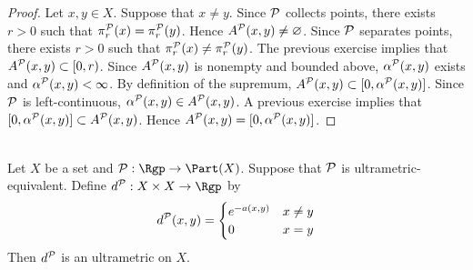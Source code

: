 \documentclass{book}
\begin{document}
\begin{proof}
	Let $x,y \in X$. Suppose that $x \neq y$. Since $\mathcal{P}$ collects points, there exists $r > 0$ such that $\pi^{\mathcal{P}}_r(x) = \pi^{\mathcal{P}}_r(y)$. Hence $A^{\mathcal{P}}(x,y) \neq \varnothing$. Since $\mathcal{P}$ separates points, there exists $r > 0$ such that $\pi^{\mathcal{P}}_r(x) \neq \pi^{\mathcal{P}}_r(y)$. The previous exercise implies that $A^{\mathcal{P}}(x,y) \subset [0, r)$. Since $A^{\mathcal{P}}(x,y)$ is nonempty and bounded above, $\alpha^{\mathcal{P}}(x,y)$ exists and $\alpha^{\mathcal{P}}(x,y) < \infty$. By definition of the supremum, $A^{\mathcal{P}}(x,y) \subset [0, \alpha^{\mathcal{P}}(x,y)]$. Since $\mathcal{P}$ is left-continuous, $\alpha^{\mathcal{P}}(x,y) \in A^{\mathcal{P}}(x,y)$. A previous exercise implies that $[0, \alpha^{\mathcal{P}}(x,y)] \subset A^{\mathcal{P}}(x,y)$. Hence $A^{\mathcal{P}}(x,y) = [0, \alpha^{\mathcal{P}}(x,y)]$.
\end{proof}

\begin{ex}  \\ 
	Let $X$ be a set and $\MP: \Rgp \rightarrow \Part(X)$. Suppose that $\mathcal{P}$ is ultrametric-equivalent. Define $d^{\MP}: X \times X \rightarrow \Rgp$ by 
	\[
	d^{\mathcal{P}}(x,y) =
	\begin{cases}
		e^{-a(x,y)} & x \neq y \\
		0 &  x = y
	\end{cases}
	\]
	Then $d^{\mathcal{P}}$ is an ultrametric on $X$.
\end{ex}
\end{document}

